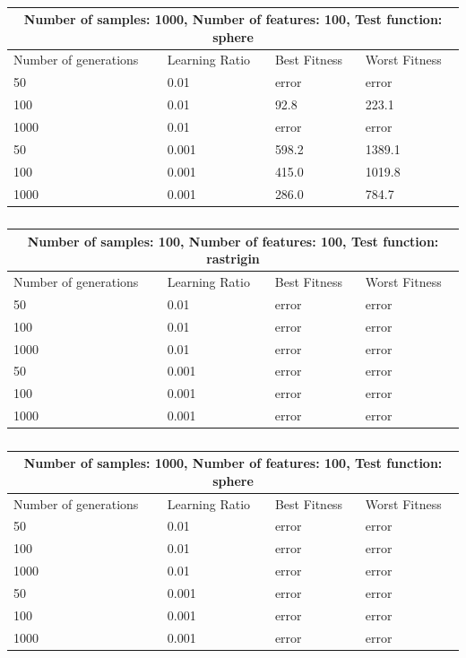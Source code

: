 \documentclass{article}
\begin{document}
\begin{table}[h]
\begin{tabular}{ |p{3cm}||p{3cm}|p{3cm}|p{3cm}|  }
	\hline
	\multicolumn{4}{|c|}{Number of samples: 1000,  Number of features: 100, Test function: sphere} \\
	\hline
	Number of generations& Learning Ratio & Best Fitness & Worst Fitness\\
	\hline
	50   & 0.01    & error & error\\
	100 &   0.01  & 92.8   &223.1\\
	1000 & 0.01 & error&  error\\
	50    &0.001 & 598.2& 1389.1\\
	100&   0.001  &415.0& 1019.8\\
	1000& 0.001  & 286.0   & 784.7\\
	
	\hline
\end{tabular}
\caption{\label{tab:table4} }
\end{table}


\begin{table}[h]
	\begin{tabular}{ |p{3cm}||p{3cm}|p{3cm}|p{3cm}|  }
		\hline
		\multicolumn{4}{|c|}{Number of samples: 100,  Number of features: 100, Test function: rastrigin} \\
		\hline
		Number of generations& Learning Ratio & Best Fitness & Worst Fitness\\
		\hline
		50   & 0.01    &error&  error\\
		100 &   0.01  & error   & error\\
		1000 & 0.01 & error&  error\\
		50    &0.001 & error& error\\
		100&   0.001  & error& error\\
		1000& 0.001  & error   &error\\
		
		\hline
	\end{tabular} 
	\caption{\label{tab:table3.1} }
\end{table}


\begin{table}[h]
	\begin{tabular}{ |p{3cm}||p{3cm}|p{3cm}|p{3cm}|  }
		\hline
		\multicolumn{4}{|c|}{Number of samples: 1000,  Number of features: 100, Test function: sphere} \\
		\hline
		Number of generations& Learning Ratio & Best Fitness & Worst Fitness\\
		\hline
		50   & 0.01    & error & error\\
		100 &   0.01  & error   & error\\
		1000 & 0.01 & error&  error\\
		50    &0.001 & error& error\\
		100&   0.001  & error & error\\
		1000& 0.001  & error   & error\\
		
		\hline
	\end{tabular}
	\caption{\label{tab:table4.1} }
\end{table}
\end{document}
